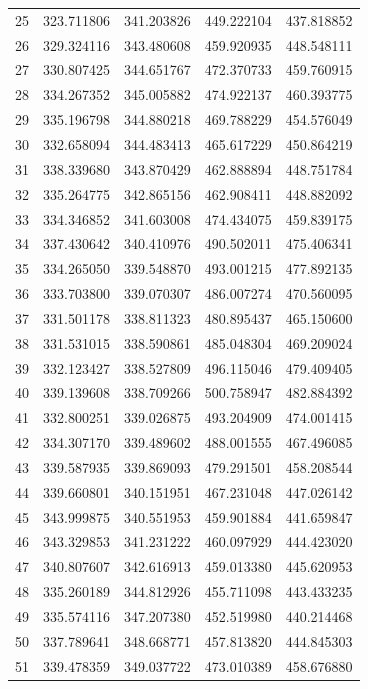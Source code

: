 \begin{table}
\begin{tabular}{rrrrr}
25 & 323.711806 & 341.203826 & 449.222104 & 437.818852 \\
26 & 329.324116 & 343.480608 & 459.920935 & 448.548111 \\
27 & 330.807425 & 344.651767 & 472.370733 & 459.760915 \\
28 & 334.267352 & 345.005882 & 474.922137 & 460.393775 \\
29 & 335.196798 & 344.880218 & 469.788229 & 454.576049 \\
30 & 332.658094 & 344.483413 & 465.617229 & 450.864219 \\
31 & 338.339680 & 343.870429 & 462.888894 & 448.751784 \\
32 & 335.264775 & 342.865156 & 462.908411 & 448.882092 \\
33 & 334.346852 & 341.603008 & 474.434075 & 459.839175 \\
34 & 337.430642 & 340.410976 & 490.502011 & 475.406341 \\
35 & 334.265050 & 339.548870 & 493.001215 & 477.892135 \\
36 & 333.703800 & 339.070307 & 486.007274 & 470.560095 \\
37 & 331.501178 & 338.811323 & 480.895437 & 465.150600 \\
38 & 331.531015 & 338.590861 & 485.048304 & 469.209024 \\
39 & 332.123427 & 338.527809 & 496.115046 & 479.409405 \\
40 & 339.139608 & 338.709266 & 500.758947 & 482.884392 \\
41 & 332.800251 & 339.026875 & 493.204909 & 474.001415 \\
42 & 334.307170 & 339.489602 & 488.001555 & 467.496085 \\
43 & 339.587935 & 339.869093 & 479.291501 & 458.208544 \\
44 & 339.660801 & 340.151951 & 467.231048 & 447.026142 \\
45 & 343.999875 & 340.551953 & 459.901884 & 441.659847 \\
46 & 343.329853 & 341.231222 & 460.097929 & 444.423020 \\
47 & 340.807607 & 342.616913 & 459.013380 & 445.620953 \\
48 & 335.260189 & 344.812926 & 455.711098 & 443.433235 \\
49 & 335.574116 & 347.207380 & 452.519980 & 440.214468 \\
50 & 337.789641 & 348.668771 & 457.813820 & 444.845303 \\
51 & 339.478359 & 349.037722 & 473.010389 & 458.676880 \\

\end{tabular}
\end{table}
